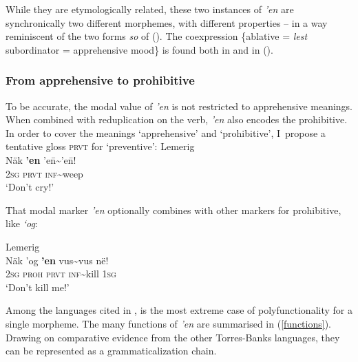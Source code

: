 \documentclass[output=paper,colorlinks,citecolor=brown]{langscibook}
\begin{document}
\noindent While they are etymologically related, these two instances of \textit{'en} are synchronically two different morphemes, with different properties -- in a way reminiscent of the two forms  \textit{so} of  (). The coexpression \{ablative = \textit{lest} subordinator = apprehensive mood\} is found both in  and in  ().



\subsubsection{From apprehensive to prohibitive}
\label{subsubsec:apptoprohib}

To be accurate, the modal value of  \textit{'en} is not restricted to apprehensive meanings. When combined with reduplication on the verb, \textit{'en} also encodes the prohibitive. In order to cover the meanings `apprehensive' and `prohibitive', I~propose a tentative gloss \textsc{prvt} for `preventive':
\newpage
\ea \label{ex:Fra22} \textnormal{Lemerig}  \\
\gll Näk \textbf{'en} 'e\={n}\textasciitilde'e\={n}!\\
\textsc{2sg} \textsc{prvt} \textsc{inf}\textasciitilde weep \\
\glt `Don't cry!' 
\z

That modal marker \textit{'en} optionally combines with other markers for prohibitive, like \textit{`og}:
 
\ea \label{ex:Fra23} \textnormal{Lemerig}  \\
\gll Näk 'og \textbf{'en} vus\textasciitilde vus në! \\
\textsc{2sg} \textsc{proh} \textsc{prvt} \textsc{inf}\textasciitilde kill \textsc{1sg} \\
\glt `Don't kill me!' 
\z

Among the languages cited in ,  is the most extreme case of polyfunctionality for a single morpheme. The many functions of \textit{'en} are summarised in (\ref{functions}). Drawing on comparative evidence from the other Torres-Banks languages, they can be represented as a grammaticalization chain. 

\end{document}
